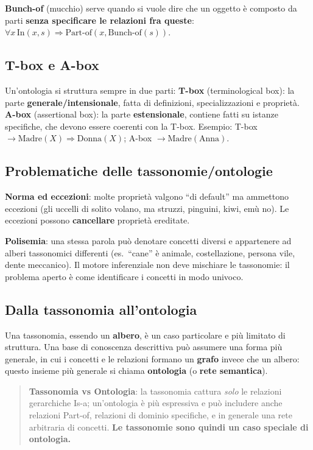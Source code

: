 \documentclass[11pt,a4paper]{report}
\begin{document}
\textbf{Bunch-of} (mucchio) serve quando si vuole dire che un oggetto è composto da parti \textbf{senza specificare le relazioni fra queste}: $\forall x\, \text{In}(x,s) \Rightarrow \text{Part-of}(x,\text{Bunch-of}(s))$.

\subsection{T-box e A-box}

Un'ontologia si struttura sempre in due parti: \textbf{T-box} (terminological box): la parte \textbf{generale/intensionale}, fatta di definizioni, specializzazioni e proprietà. \textbf{A-box} (assertional box): la parte \textbf{estensionale}, contiene fatti su istanze specifiche, che devono essere coerenti con la T-box. Esempio: T-box $\to \text{Madre}(X)\Rightarrow\text{Donna}(X)$; A-box $\to \text{Madre}(\text{Anna})$.

\subsection{Problematiche delle tassonomie/ontologie}

\textbf{Norma ed eccezioni}: molte proprietà valgono ``di default'' ma ammettono eccezioni (gli uccelli di solito volano, ma struzzi, pinguini, kiwi, emù no). Le eccezioni possono \textbf{cancellare} proprietà ereditate.

\textbf{Polisemia}: una stessa parola può denotare concetti diversi e appartenere ad alberi tassonomici differenti (es.\ ``cane'' è animale, costellazione, persona vile, dente meccanico). Il motore inferenziale non deve mischiare le tassonomie: il problema aperto è come identificare i concetti in modo univoco.

\subsection{Dalla tassonomia all'ontologia}

Una tassonomia, essendo un \textbf{albero}, è un caso particolare e più limitato di struttura. Una base di conoscenza descrittiva può assumere una forma più generale, in cui i concetti e le relazioni formano un \textbf{grafo} invece che un albero: questo insieme più generale si chiama \textbf{ontologia} (o \textbf{rete semantica}).

\begin{quote}
\textbf{Tassonomia vs Ontologia}: la tassonomia cattura \emph{solo} le relazioni gerarchiche Is-a; un'ontologia è più espressiva e può includere anche relazioni Part-of, relazioni di dominio specifiche, e in generale una rete arbitraria di concetti. \textbf{Le tassonomie sono quindi un caso speciale di ontologia.}
\end{quote}
\end{document}
